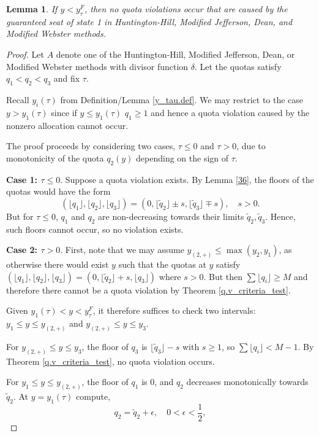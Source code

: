 \documentclass[11pt]{article}
\newtheorem{lemma}[theorem]{Lemma}
\theoremstyle{definition}
\theoremstyle{definition}
\begin{document}
\begin{lemma}\label{y<T(t)}
If $y < y_{\tau}^F$, then no quota violations occur that are caused by the guaranteed seat of state 1 in Huntington-Hill, Modified Jefferson, Dean, and Modified Webster methods.
\end{lemma}
\begin{proof}
Let $A$ denote one of the Huntington-Hill, Modified Jefferson, Dean, or Modified Webster methods with divisor function $\delta$. Let the quotas satisfy $q_1 < q_2 < q_3$ and fix $\tau$. 

Recall $y_i(\tau)$ from Definition/Lemma \ref{y_tau.def}. We may restrict to the case $y>y_1(\tau)$ since if $y \leq y_1(\tau)$ $q_1 \geq 1$ and hence a quota violation caused by the nonzero allocation cannot occur.


The proof proceeds by considering two cases, $\tau \le 0$ and $\tau > 0$, due to monotonicity of the quota $q_2(y)$ depending on the sign of $\tau$.

\textbf{Case 1: $\tau \le 0$}. 
Suppose a quota violation exists. By Lemma \ref{36}, the floors of the quotas would have the form
$$
(\lfloor q_1 \rfloor, \lfloor q_2 \rfloor, \lfloor q_3 \rfloor) = (0, \lfloor \tilde q_2 \rfloor \pm s, \lfloor \tilde q_3 \rfloor \mp s), \quad s > 0.
$$
But for $\tau \le 0$, $q_1$ and $q_2$ are non-decreasing towards their limits $\tilde q_2, \tilde q_3$. Hence, such floors cannot occur, so no violation exists.

\textbf{Case 2: $\tau > 0$}. 
First, note that we may assume $y_{(2,+)} \leq \max(y_2, y_1)$, as otherwise there would exist $y$ such that the quotas at $y$ satisfy $(\lfloor q_1 \rfloor , \lfloor q_2 \rfloor, \lfloor q_3 \rfloor) = (0, \lfloor \tilde q_2 \rfloor +s, \lfloor q_3 \rfloor )$ where $s >0$. But then $\sum \lfloor q_i \rfloor \geq M$ and therefore there cannot be a quota violation by Theorem \ref{q.v_criteria_test}.

Given $y_1(\tau)<y < y_\tau^F$, it therefore suffices to check two intervals: $y_1 \le y \le y_{(2,+)}$ and $y_{(2,+)} \le y \le y_3$.

For $y_{(2,+)} \le y \le y_3$, the floor of $q_3$ is $\lfloor \tilde q_3 \rfloor - s$ with $s \ge 1$, so $\sum \lfloor q_i \rfloor < M-1$. By Theorem \ref{q.v_criteria_test}, no quota violation occurs.

For $y_1 \le y \le y_{(2,+)}$, the floor of $q_1$ is 0, and $q_2$ decreases monotonically towards $\tilde q_2$. At $y = y_1(\tau)$ compute, 
$$
q_2 = \tilde q_2 + \epsilon, \quad 0 < \epsilon < \frac{1}{2},
$$


\end{proof}
\end{document}
